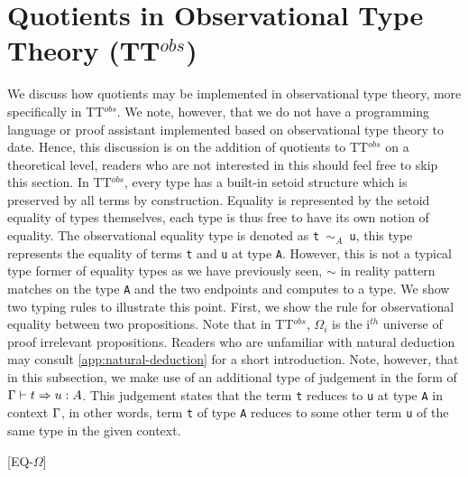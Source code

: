 \documentclass[12pt,twoside,maitrise]{dms}
\theoremstyle{definition}
\numberwithin{equation}{section}
\numberwithin{table}{chapter}
\numberwithin{figure}{chapter}
\newcommand\kw[1] {\textsf{#1}}
\newcommand\id[1] {\texttt{#1}}
\newcommand\fn[1] {\texttt{#1}}
\begin{document}
\section{Quotients in Observational Type Theory (TT$^{obs}$)}


We discuss how quotients may be implemented in observational type theory, more
specifically in TT$^{obs}$\cite{pujet2022observational}. We note, however, that
we do not have a programming language or proof assistant implemented based on
observational type theory to date. Hence, this discussion is on the addition of
quotients to TT$^{obs}$ on a theoretical level, readers who are not interested
in this should feel free to skip this section. In TT$^{obs}$, every type has a
built-in setoid structure which is preserved by all terms by construction.
Equality is represented by the setoid equality of types themselves, each type
is thus free to have its own notion of equality. The observational equality
type is denoted as \fn{t $\sim_A$ u}, this type represents the equality of
terms \id{t} and \id{u} at type \id{A}. However, this is not a typical type
former of equality types as we have previously seen, $\sim$ in reality pattern
matches on the type \id{A} and the two endpoints and computes to a type. We
show two typing rules to illustrate this point. First, we show the rule for
observational equality between two propositions. Note that in TT$^{obs}$,
$\Omega_i$ is the i$^{th}$ universe of proof irrelevant propositions. Readers
who are unfamiliar with natural deduction may consult
\autoref{app:natural-deduction} for a short introduction. Note, however, that
in this subsection, we make use of an additional type of judgement in the form
of $\oftype{\ctx}{t \Rightarrow{} u}{A}$. This judgement states that the
term \id{t} reduces to \id{u} at type \id{A} in context $\Gamma$, in other words,
term \id{t} of type \id{A} reduces to some other term \id{u} of the same type
in the given context.

\begin{prooftree*}

  [\kw{EQ-$\Omega$}]{}
\end{prooftree*}
\end{document}
